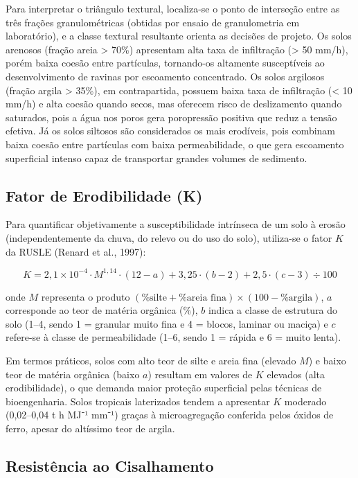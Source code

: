 \documentclass[
  portuguese,
  11pt,
  a4paper,
  open=any]{scrbook}
\begin{document}
Para interpretar o triângulo textural, localiza-se o ponto de interseção
entre as três frações granulométricas (obtidas por ensaio de
granulometria em laboratório), e a classe textural resultante orienta as
decisões de projeto. Os solos arenosos (fração areia \textgreater{}
70\%) apresentam alta taxa de infiltração (\textgreater{} 50 mm/h),
porém baixa coesão entre partículas, tornando-os altamente susceptíveis
ao desenvolvimento de ravinas por escoamento concentrado. Os solos
argilosos (fração argila \textgreater{} 35\%), em contrapartida, possuem
baixa taxa de infiltração (\textless{} 10 mm/h) e alta coesão quando
secos, mas oferecem risco de deslizamento quando saturados, pois a água
nos poros gera poropressão positiva que reduz a tensão efetiva. Já os
solos siltosos são considerados os mais erodíveis, pois combinam baixa
coesão entre partículas com baixa permeabilidade, o que gera escoamento
superficial intenso capaz de transportar grandes volumes de sedimento.

\subsection{Fator de Erodibilidade (K)}\label{fator-de-erodibilidade-k}

Para quantificar objetivamente a susceptibilidade intrínseca de um solo
à erosão (independentemente da chuva, do relevo ou do uso do solo),
utiliza-se o fator \(K\) da RUSLE (Renard et al., 1997):

\[
K = 2{,}1 \times 10^{-4} \cdot M^{1{,}14} \cdot (12 - a) + 3{,}25 \cdot (b - 2) + 2{,}5 \cdot (c - 3) \div 100
\]

onde \(M\) representa o produto
\((\% \text{silte} + \% \text{areia fina}) \times (100 - \% \text{argila})\),
\(a\) corresponde ao teor de matéria orgânica (\%), \(b\) indica a
classe de estrutura do solo (1--4, sendo 1 = granular muito fina e 4 =
blocos, laminar ou maciça) e \(c\) refere-se à classe de permeabilidade
(1--6, sendo 1 = rápida e 6 = muito lenta).

Em termos práticos, solos com alto teor de silte e areia fina (elevado
\(M\)) e baixo teor de matéria orgânica (baixo \(a\)) resultam em
valores de \(K\) elevados (alta erodibilidade), o que demanda maior
proteção superficial pelas técnicas de bioengenharia. Solos tropicais
laterizados tendem a apresentar \(K\) moderado (0,02--0,04 t h MJ⁻¹
mm⁻¹) graças à microagregação conferida pelos óxidos de ferro, apesar do
altíssimo teor de argila.

\subsection{Resistência ao
Cisalhamento}\label{resistuxeancia-ao-cisalhamento}
\end{document}
